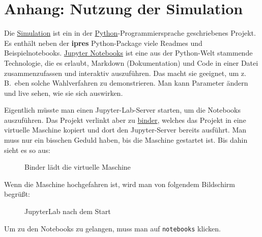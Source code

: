 \section{Anhang: Nutzung der Simulation}

Die \href{https://github.com/danielschwalbe/ipres}{Simulation} ist ein in der
\href{https://www.python.org}{Python}-Programmiersprache geschriebenes Projekt. Es enthält neben
der \textbf{ipres} Python-Package viele Readmes und Beispielnotebooks.
\href{https://jupyter.org}{Jupyter Notebooks} ist eine aus der Python-Welt stammende Technologie,
die es erlaubt, Markdown (Dokumentation) und Code in einer Datei zusammenzufassen und interaktiv
auszuführen. Das macht sie geeignet, um z.\,B.\ eben solche Wahlverfahren zu demonstrieren. Man
kann Parameter ändern und live sehen, wie sie sich auswirken.

Eigentlich müsste man einen Jupyter-Lab-Server starten, um die Notebooks auszuführen. Das Projekt
verlinkt aber zu \href{https://mybinder.org/v2/gh/danielschwalbe/ipres/HEAD}{binder}, welches das
Projekt in eine virtuelle Maschine kopiert und dort den Jupyter-Server bereits ausführt. Man muss
nur ein bisschen Geduld haben, bis die Maschine gestartet ist. Bis dahin sieht es so aus:

\begin{figure}[h]
  \centering
  \caption{Binder lädt die virtuelle Maschine}
\end{figure}

Wenn die Maschine hochgefahren ist, wird man von folgendem Bildschirm begrüßt:

\begin{figure}[h]
  \centering
  \caption{JupyterLab nach dem Start}
\end{figure}

Um zu den Notebooks zu gelangen, muss man auf \texttt{notebooks} klicken.


